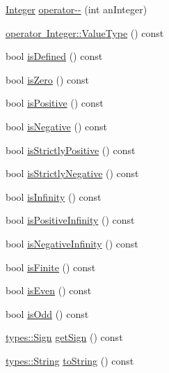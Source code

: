 \begin{DoxyCompactItemize}
\item 
\mbox{\hyperlink{classlibrary_1_1core_1_1types_1_1_integer}{Integer}} \mbox{\hyperlink{classlibrary_1_1core_1_1types_1_1_integer_ad8889e78cffb5b540d2f69d36d36e049}{operator-\/-\/}} (int an\+Integer)
\item 
\mbox{\hyperlink{classlibrary_1_1core_1_1types_1_1_integer_ad1cf430796727e18440d50d4764b2792}{operator Integer\+::\+Value\+Type}} () const
\item 
bool \mbox{\hyperlink{classlibrary_1_1core_1_1types_1_1_integer_a5edecf8abe00a8de9e021b8cc2b38c25}{is\+Defined}} () const
\item 
bool \mbox{\hyperlink{classlibrary_1_1core_1_1types_1_1_integer_a9b3f0fac0463a8863c46a69f14a91d15}{is\+Zero}} () const
\item 
bool \mbox{\hyperlink{classlibrary_1_1core_1_1types_1_1_integer_a78058bede904b0b730e6a0924296bae5}{is\+Positive}} () const
\item 
bool \mbox{\hyperlink{classlibrary_1_1core_1_1types_1_1_integer_a7fbd4836c6a0f0eab96689dc20e39118}{is\+Negative}} () const
\item 
bool \mbox{\hyperlink{classlibrary_1_1core_1_1types_1_1_integer_a45cbf113ae4656add845025e5ee6b61a}{is\+Strictly\+Positive}} () const
\item 
bool \mbox{\hyperlink{classlibrary_1_1core_1_1types_1_1_integer_adaa9696b642dea4b9075b5a58e141958}{is\+Strictly\+Negative}} () const
\item 
bool \mbox{\hyperlink{classlibrary_1_1core_1_1types_1_1_integer_a99a5c50599c55929e11c7afae4a21709}{is\+Infinity}} () const
\item 
bool \mbox{\hyperlink{classlibrary_1_1core_1_1types_1_1_integer_a82713f4a7737cf59ad402bceb5f2017f}{is\+Positive\+Infinity}} () const
\item 
bool \mbox{\hyperlink{classlibrary_1_1core_1_1types_1_1_integer_ae7e2fcfb35272cf58b5e548a7702950c}{is\+Negative\+Infinity}} () const
\item 
bool \mbox{\hyperlink{classlibrary_1_1core_1_1types_1_1_integer_a892617aa8be82ac3c4e4dfb9129c7613}{is\+Finite}} () const
\item 
bool \mbox{\hyperlink{classlibrary_1_1core_1_1types_1_1_integer_a12f0f831be3e8a88c2e4ea250a9019e5}{is\+Even}} () const
\item 
bool \mbox{\hyperlink{classlibrary_1_1core_1_1types_1_1_integer_a4b403f5ac370a1f333c67fda7c54e1ed}{is\+Odd}} () const
\item 
\mbox{\hyperlink{namespacelibrary_1_1core_1_1types_a06d9eaa410d43a0fa3f383040618e87d}{types\+::\+Sign}} \mbox{\hyperlink{classlibrary_1_1core_1_1types_1_1_integer_abe567cca5d1e448329195df5d16d48e6}{get\+Sign}} () const
\item 
\mbox{\hyperlink{classlibrary_1_1core_1_1types_1_1_string}{types\+::\+String}} \mbox{\hyperlink{classlibrary_1_1core_1_1types_1_1_integer_a000d4725230ff312cd64e0f7f4ca2ad0}{to\+String}} () const
\end{DoxyCompactItemize}
